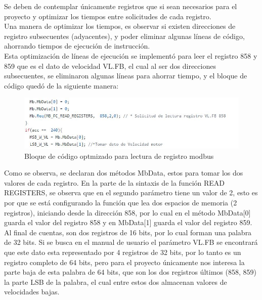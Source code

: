 \documentclass[12pt,titlepage]{article}
\begin{document}
Se deben de contemplar únicamente registros que si sean necesarios para el proyecto y optimizar los tiempos entre solicitudes de cada registro. \\ 

Una manera de optimizar los tiempos, es observar si existen direcciones de registro subsecuentes (adyacentes), y poder eliminar algunas líneas de código, ahorrando tiempos de ejecución de instrucción. \\
\newpage
Esta optimización de líneas de ejecución se implementó para leer el registro 858 y 859 que es el dato de velocidad VL.FB, el cual al ser dos direcciones subsecuentes, se eliminaron algunas líneas para ahorrar tiempo, y el bloque de código quedó de la siguiente manera: \\

  \begin{figure}[htbp]
\hspace*{1.9cm} 
\includegraphics[scale=0.80]{optimizacion_reg}
\caption{Bloque de código optmizado para lectura de registro modbus}
\end{figure}

Como se observa, se declaran dos métodos MbData, estos para tomar los dos valores de cada registro. En la parte de la sintaxis de la función READ REGISTERS,  se observa que en el segundo parámetro tiene un valor de 2, esto es por que se está configurando la función que lea dos espacios de memoria (2 registros), iniciando desde la dirección 858, por lo cual en el método MbData[0] guarda el valor del registro 858 y en MbData[1] guarda el valor del registro 859. \\

Al final de cuentas, son dos registros de 16 bits, por lo cual forman una palabra de 32 bits. Si se busca en el manual de usuario el parámetro VL.FB se encontrará que este dato esta representado por 4 registros de 32 bits, por lo tanto es un registro completo de 64 bits, pero para el proyecto únicamente nos interesa la parte baja de esta palabra de 64 bits, que son los dos registros últimos (858, 859) la parte LSB de la palabra, el cual entre estos dos almacenan valores de velocidades bajas. \\
\end{document}
